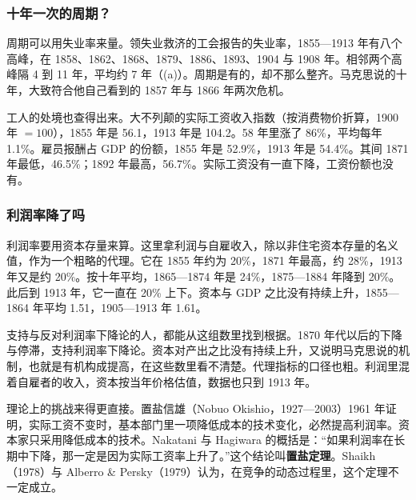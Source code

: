 \subsubsection{十年一次的周期？}
周期可以用失业率来量。领失业救济的工会报告的失业率，1855—1913 年有八个高峰，在 1858、1862、1868、1879、1886、1893、1904 与 1908 年\cite{boe2017,feinstein1972}。相邻两个高峰隔 4 到 11 年，平均约 7 年（(a)）。周期是有的，却不那么整齐。马克思说的十年，大致符合他自己看到的 1857 年与 1866 年两次危机\cite{marx1887}。


工人的处境也查得出来。大不列颠的实际工资收入指数（按消费物价折算，1900 年 $=100$），1855 年是 56.1，1913 年是 104.2\cite{boe2017}。58 年里涨了 86\%，平均每年 1.1\%。雇员报酬占 GDP 的份额，1855 年是 52.9\%，1913 年是 54.4\%\cite{boe2017,mitchell1988}。其间 1871 年最低，46.5\%；1892 年最高，56.7\%。实际工资没有一直下降，工资份额也没有。

\subsubsection{利润率降了吗}
利润率要用资本存量来算。这里拿利润与自雇收入，除以非住宅资本存量的名义值，作为一个粗略的代理\cite{boe2017,mitchell1988,feinsteinpollard1988}。它在 1855 年约为 20\%，1871 年最高，约 28\%，1913 年又是约 20\%。按十年平均，1865—1874 年是 24\%，1875—1884 年降到 20\%。此后到 1913 年，它一直在 20\% 上下。资本与 GDP 之比没有持续上升，1855—1864 年平均 1.51，1905—1913 年 1.61。

支持与反对利润率下降论的人，都能从这组数里找到根据。1870 年代以后的下降与停滞，支持利润率下降论。资本对产出之比没有持续上升，又说明马克思说的机制，也就是有机构成提高，在这些数里看不清楚。代理指标的口径也粗。利润里混着自雇者的收入，资本按当年价格估值，数据也只到 1913 年。

理论上的挑战来得更直接。置盐信雄（Nobuo Okishio，1927—2003）1961 年证明，实际工资不变时，基本部门里一项降低成本的技术变化，必然提高利润率\cite{okishio1961,nakatani1997}。资本家只采用降低成本的技术。Nakatani 与 Hagiwara 的概括是：“如果利润率在长期中下降，那一定是因为实际工资率上升了。”\cite{nakatani1997}这个结论叫\textbf{置盐定理}。Shaikh（1978）与 Alberro \& Persky（1979）认为，在竞争的动态过程里，这个定理不一定成立\cite{shaikh1978,alberro1979,nakatani1997}。

